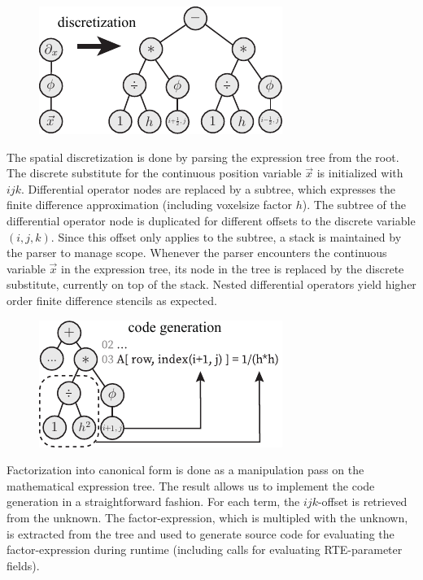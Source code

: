 \begin{figure}
\hspace{-.2in}
\includegraphics[width=0.6\columnwidth]{figures/fig_discretization.pdf}
\end{figure}The spatial discretization is done by parsing the expression tree from the root. The discrete substitute for the continuous position variable $\vec{x}$ is initialized with $ijk$. Differential operator nodes are replaced by a subtree, which expresses the finite difference approximation (including voxelsize factor $h$). The subtree of the differential operator node is duplicated for different offsets to the discrete variable $(i, j, k)$. Since this offset only applies to the subtree, a stack is maintained by the parser to manage scope. Whenever the parser encounters the continuous variable $\vec{x}$ in the expression tree, its node in the tree is replaced by the discrete substitute, currently on top of the stack. Nested differential operators yield higher order finite difference stencils as expected.

\begin{figure}
\hspace{-.2in}
\includegraphics[width=0.6\columnwidth]{figures/fig_codegen.pdf}
\end{figure}
Factorization into canonical form is done as a manipulation pass on the mathematical expression tree. The result allows us to implement the code generation in a straightforward fashion. For each term, the $ijk$-offset is retrieved from the unknown. The factor-expression, which is multipled with the unknown, is extracted from the tree and used to generate source code for evaluating the factor-expression during runtime (including calls for evaluating RTE-parameter fields).


